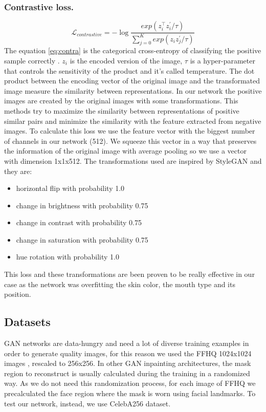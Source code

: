 \documentclass[10pt,twocolumn,letterpaper]{article}
\begin{document}
\subsubsection{Contrastive loss.}
\begin{dmath}\label{eq:contra}
    \mathcal{L}_{contrastive} = - \log{\frac{exp(z_{i}^\intercal
    z_{i}^{'}/\tau)}{\sum_{j=0}^{K}exp(z_{i}z_{j}^{'}/\tau)}}
\end{dmath}
The equation \eqref{eq:contra} is the categorical cross-entropy of classifying
the positive sample correctly \cite{oord2018representation}. $z_i$ is the
encoded version of the image, \(\tau\) is a hyper-parameter that controls the
sensitivity of the product and it's
called temperature. The dot product between the encoding vector of the original
image and the transformated image measure the similarity between representations.
In our network the positive images are created by the original images with some
transformations. This methods try to maximize the similarity between
representations of positive similar pairs and minimize the similarity with the
feature extracted from negative images\cite{le2020contrastive}.
To calculate this loss we use the feature vector with the biggest number of
channels in our network (512). We squeeze this vector in a way that preserves the
information of the original image with average pooling so we use a vector with
dimension 1x1x512. The transformations used are inspired by
StyleGAN\cite{karras2020analyzing} and they are:
\begin{itemize}
  \item horizontal flip with probability 1.0
  \item change in brightness with probability 0.75
  \item change in contrast with probability 0.75
  \item change in saturation with probability 0.75
  \item hue rotation with probability 1.0
\end{itemize}
This loss and these transformations are been proven to be really effective in
our case as the network was overfitting the skin color, the mouth type and its
position.

\subsection{Datasets}
GAN networks are data-hungry and need a lot of diverse training examples in
order to generate quality images, for this reason we used the FFHQ 1024x1024
images \cite{karras2019style}, rescaled to 256x256.  In other GAN inpainting
architectures, the mask region to reconstruct is usually calculated during the
training in a randomized way.  As we do not need this randomization process, for
each image of FFHQ we precalculated the face region where the mask is worn
using facial landmarks. To test our network, instead, we use CelebA256 dataset.
\end{document}

